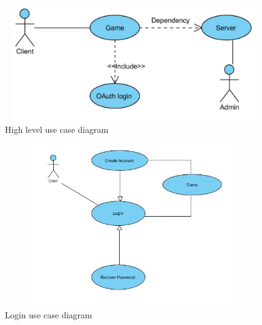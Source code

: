 \documentclass[letterpaper]{article}
\begin{document}
		\section*{\colorbox{blue}{}} 
		
		\vspace{0.2in}
		
		\begin{figure}[ht!]
		\centering
		\includegraphics[width=180mm, height=50mm]{UML_Diagram/Use_Case/High_Level}
		\caption{High level use case diagram}
		\label{overflow}
		\end{figure}
		
		\begin{figure}[H]
		\centering
		\includegraphics[width=180mm, height=70mm]{UML_Diagram/Use_Case/login_simple}
		\caption{Login use case diagram}
		\label{overflow}
		\end{figure}		
				
		\vspace{0.2in}
		
		\section*{\colorbox{blue}{}} 
				
\end{document}
